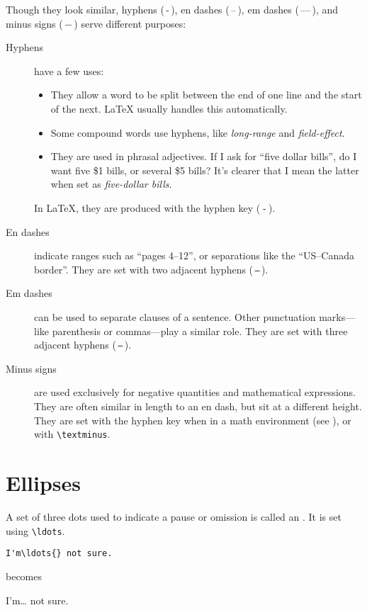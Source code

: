 Though they look similar,
hyphens (\,-\,), en dashes (\,--\,),
em dashes (\,---\,), and minus signs (\,$-$\,)
serve different purposes:
\begin{description}
\item[Hyphens] have a few uses:
    \begin{itemize}[leftmargin=*]
    \item They allow a word to be split between the end of one line and the
        start of the next.
        \LaTeX{} usually handles this automatically.
    \item Some compound words use hyphens, like \emph{long-range}
        and \emph{field-effect}.
    \item They are used in phrasal adjectives.
        If I ask for ``five dollar bills''\punckern,
        do I want five \$1 bills, or several \$5 bills?
        It's clearer that I mean the latter when set as
        \emph{five-dollar bills}.
    \end{itemize}
    In \LaTeX{}, they are produced with the hyphen key (\,\texttt{-}\,).

\item[En dashes] indicate ranges such as ``pages 4--12''\quotekern,
    or separations like the ``US--Canada border''\quotekern.
    They are set with two adjacent hyphens (\,\texttt{--}\,).

\item[Em dashes] can be used to separate clauses of a sentence.
    Other punctuation marks---like parenthesis or commas---play a similar
    role.
    They are set with three adjacent hyphens (\,\texttt{---}\,).

\item[Minus signs] are used exclusively for negative quantities and
    mathematical expressions.
    They are often similar in length to an en dash,
    but sit at a different height.
    They are set with the hyphen key when in a math environment
    (see ), or with \verb|\textminus|.
\end{description}

\section{Ellipses}

A set of three dots used to indicate a pause or omission is called an
.
It is set using \verb|\ldots|.
\begin{leftfigure}
\begin{lstlisting}
I'm\ldots{} not sure.
\end{lstlisting}
\end{leftfigure}
becomes
\begin{leftfigure}
\lm%
I'm\ldots{} not sure.
\end{leftfigure}

